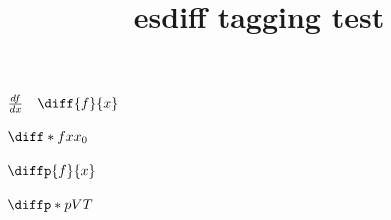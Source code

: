 \documentclass{article}
\title{esdiff tagging test}
\begin{document}
$\frac{df}{dx} \quad \diff{f}{x}$

$\diff*{f}{x}{x_0}$

$\diffp{f}{x}$

$\diffp*{p}{V}{T}$
\end{document}
